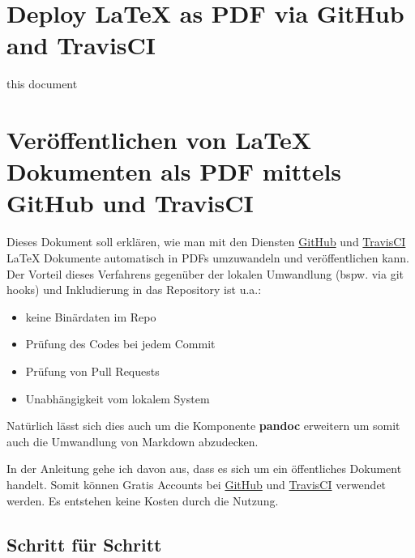 \documentclass[]{article}
\date{}
\providecommand{\tightlist}{%
  \setlength{\itemsep}{0pt}\setlength{\parskip}{0pt}}
\begin{document}
\section{Deploy LaTeX as PDF via GitHub and
TravisCI}\label{deploy-latex-as-pdf-via-github-and-travisci}

this document

\section{Veröffentlichen von LaTeX Dokumenten als PDF mittels GitHub und
TravisCI}\label{veruxf6ffentlichen-von-latex-dokumenten-als-pdf-mittels-github-und-travisci}

Dieses Dokument soll erklären, wie man mit den Diensten
\href{https://github.com/}{GitHub} und
\href{https://travis-ci.org/}{TravisCI} LaTeX Dokumente automatisch in
PDFs umzuwandeln und veröffentlichen kann. Der Vorteil dieses Verfahrens
gegenüber der lokalen Umwandlung (bspw. via git hooks) und Inkludierung
in das Repository ist u.a.:

\begin{itemize}
\tightlist
\item
  keine Binärdaten im Repo
\item
  Prüfung des Codes bei jedem Commit
\item
  Prüfung von Pull Requests
\item
  Unabhängigkeit vom lokalem System
\end{itemize}

Natürlich lässt sich dies auch um die Komponente \textbf{pandoc}
erweitern um somit auch die Umwandlung von Markdown abzudecken.

In der Anleitung gehe ich davon aus, dass es sich um ein öffentliches
Dokument handelt. Somit können Gratis Accounts bei
\href{https://github.com/}{GitHub} und
\href{https://travis-ci.org/}{TravisCI} verwendet werden. Es entstehen
keine Kosten durch die Nutzung.

\subsection{Schritt für Schritt}\label{schritt-fuxfcr-schritt}
\end{document}

